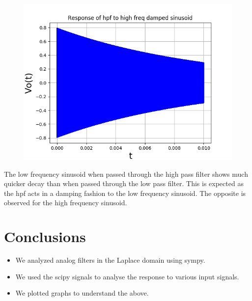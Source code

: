 \documentclass[11pt, a4paper]{article}
\begin{document}
\begin{figure}[!tbh]
   	\centering
   	\includegraphics[scale=0.5]{img10.png}
   	\label{fig:32}
   \end{figure}

{
The low frequency sinusoid when passed through the high pass filter shows much quicker decay than when passed through the low pass filter.
This is expected as the hpf acts in a damping fashion to the low frequency sinusoid.
The opposite is observed for the high frequency sinusoid.

}




\section{Conclusions}
\begin{itemize}
\item We  analyzed analog filters in the Laplace domain using sympy.
\item We used the scipy signals to analyse the response to various input signals.
\item We plotted graphs to understand the above.
\end{itemize}
\end{document}
